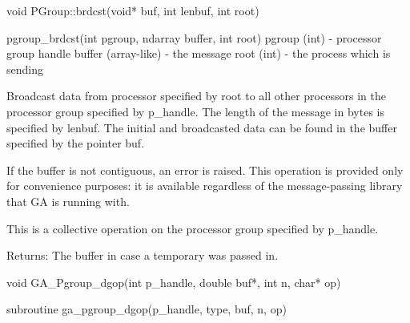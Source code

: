 \documentclass[12pt]{article}
\begin{document}
\begin{cxxapi}
\begin{cxxcode}
void PGroup::brdcst(void* buf, int lenbuf, int root)
\end{cxxcode}
\begin{funcargs}
\end{funcargs}
\end{cxxapi}

\begin{pyapi}
\begin{pycode}
pgroup_brdcst(int pgroup, ndarray buffer, int root)
   pgroup (int)        - processor group handle
   buffer (array-like) - the message
   root (int)          - the process which is sending
\end{pycode}
\end{pyapi}
\gcoll
\begin{desc}

Broadcast data from processor specified by root to all other processors in the processor group specified by p_handle. The length of the message in bytes is specified by lenbuf. The initial and broadcasted data can be found in the buffer specified by the pointer buf.

If the buffer is not contiguous, an error is raised. This operation is provided only for convenience purposes: it is available regardless of the message-passing library that GA is running with.


This is a collective operation on the processor group specified by p_handle.

Returns:
The buffer in case a temporary was passed in.
\end{desc}


\begin{capi}
\begin{ccode}
void GA_Pgroup_dgop(int p_handle, double buf*, int n, char* op)
\end{ccode}
\begin{funcargs}
\end{funcargs}
\end{capi}

\begin{fapi}
\begin{fcode}
subroutine ga_pgroup_dgop(p_handle, type, buf, n, op)
\end{fcode}
\begin{funcargs}
\end{funcargs}
\end{fapi}
\end{document}

